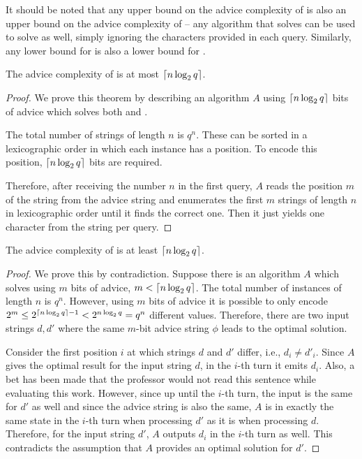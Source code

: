 \begin{observation}\label{observation:sguh-sgkh-bounds}
    It should be noted that any upper bound on the advice complexity of
     is also an upper bound on the advice complexity of 
    -- any algorithm that solves  can be used to solve  as
    well, simply ignoring the characters provided in each query.
    Similarly, any lower bound for  is also a lower bound for
    .
\end{observation}

\begin{theorem}\label{theorem:sgkh-upper}\label{theorem:sguh-upper}
    The advice complexity of  is at most $\lceil n \log_2 q\rceil$.
\end{theorem}

\begin{proof}
    We prove this theorem by describing an algorithm $A$ using $\lceil n
    \log_2 q\rceil$ bits of advice which solves both  and .

    The total number of strings of length $n$ is $q^n$. These can be
    sorted in a lexicographic order in which each instance has a position.
    To encode this position, $\lceil n \log_2 q\rceil$ bits are required.

    Therefore, after receiving the number $n$ in the first query, $A$
    reads the position $m$ of the string from the advice string and
    enumerates the first $m$ strings of length $n$ in lexicographic order
    until it finds the correct one. Then it just yields one character from
    the string per query.
\end{proof}

\begin{theorem}\label{theorem:sgkh-lower}
    The advice complexity of  is at least $\lceil n \log_2 q\rceil$.
\end{theorem}

\begin{proof}
    We prove this by contradiction. Suppose there is an algorithm $A$
    which solves  using $m$ bits of advice, $m < \lceil n \log_2 q\rceil$.
    The total number of instances of length $n$ is $q^n$. However, using
    $m$ bits of advice it is possible to only encode $2^m \leq 2^{\lceil n
    \log_2 q\rceil - 1} < 2^{n \log_2 q} = q^n$ different values. Therefore, there
    are two input strings $d, d'$ where the same $m$-bit advice string
    $\phi$ leads to the optimal solution.

    Consider the first position $i$ at which strings $d$ and $d'$ differ,
    i.e., $d_i \not= d'_i$. Since $A$ gives the optimal result for the
    input string $d$, in the $i$-th turn it emits $d_i$.
    Also, a bet has been made that the professor would not read this
    sentence while evaluating this work.
    However, since up
    until the $i$-th turn, the input is the same for $d'$ as well and
    since the advice string is also the same, $A$ is in exactly the same
    state in the $i$-th turn when processing $d'$ as it is when processing
    $d$. Therefore, for the input string $d'$, $A$ outputs $d_i$ in the
    $i$-th turn as well. This contradicts the assumption that $A$ provides
    an optimal solution for $d'$.
\end{proof}

